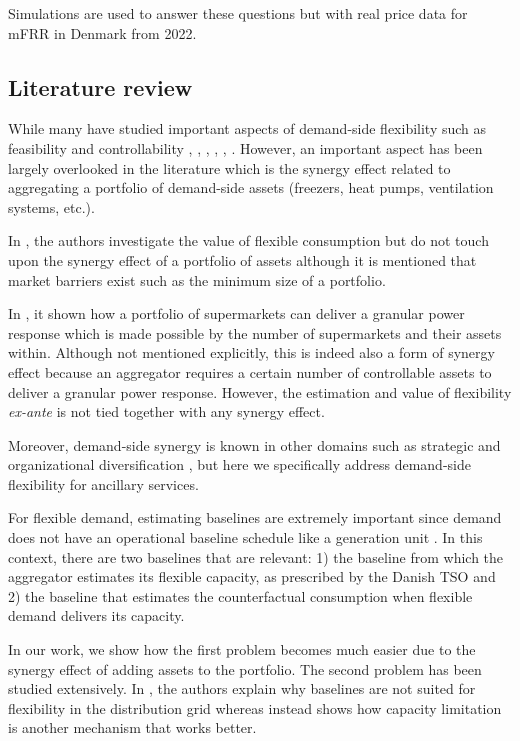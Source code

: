 \documentclass[lettersize,journal]{IEEEtran}
\begin{document}
Simulations are used to answer these questions but with real price data for mFRR in Denmark from 2022.

\subsection{Literature review}

While many have studied important aspects of demand-side flexibility such as feasibility and controllability \cite{bondy2018redefining}, \cite{bondy2017performance}, \cite{bondy2016procedure}, \cite{bondy2014performance}, \cite{biegel2014integration}, \cite{AchievingControllabilityofElectricLoads}. However, an important aspect has been largely overlooked in the literature which is the synergy effect related to aggregating a portfolio of demand-side assets (freezers, heat pumps, ventilation systems, etc.).

In \cite{biegel2014value}, the authors investigate the value of flexible consumption but do not touch upon the synergy effect of a portfolio of assets although it is mentioned that market barriers exist such as the minimum size of a portfolio.

In \cite{pedersen2014aggregation}, it shown how a portfolio of supermarkets can deliver a granular power response which is made possible by the number of supermarkets and their assets within. Although not mentioned explicitly, this is indeed also a form of synergy effect because an aggregator requires a certain number of controllable assets to deliver a granular power response. However, the estimation and value of flexibility \textit{ex-ante} is not tied together with any synergy effect.

Moreover, demand-side synergy is known in other domains such as strategic and organizational diversification \cite{ye2012achieving}, but here we specifically address demand-side flexibility for ancillary services.

For flexible demand, estimating baselines are extremely important since demand does not have an operational baseline schedule like a generation unit \cite{gade2022ecosystem}. In this context, there are two baselines that are relevant: 1) the baseline from which the aggregator estimates its flexible capacity, as prescribed by the Danish TSO \cite{energinet:prequalification} and 2) the baseline that estimates the counterfactual consumption when flexible demand delivers its capacity. 

In our work, we show how the first problem becomes much easier due to the synergy effect of adding assets to the portfolio. The second problem has been studied extensively. In \cite{ziras2021baselines}, the authors explain why baselines are not suited for flexibility in the distribution grid whereas \cite{capacity_limitation_services} instead shows how capacity limitation is another mechanism that works better. 
\end{document}
